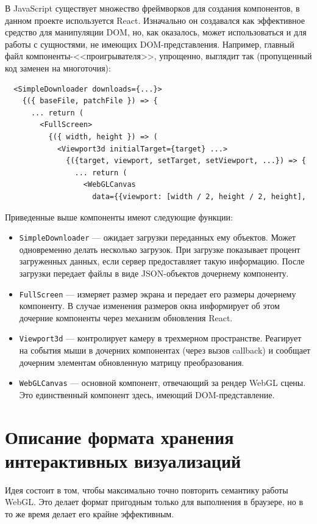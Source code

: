В JavaScript существует множество фреймворков для создания компонентов, в данном проекте используется React. Изначально он создавался как эффективное средство для манипуляции DOM, но, как оказалось, может использоваться и для работы с сущностями, не имеющих DOM-представления. Например, главный файл компоненты-<<проигрывателя>>, упрощенно, выглядит так (пропущенный код заменен на многоточия):
\begin{verbatim}
  <SimpleDownloader downloads={...}>
    {({ baseFile, patchFile }) => {
      ... return (
        <FullScreen>
          {({ width, height }) => (
            <Viewport3d initialTarget={target} ...>
              {({target, viewport, setTarget, setViewport, ...}) => {
                ... return (
                  <WebGLCanvas
                    data={{viewport: [width / 2, height / 2, height],
\end{verbatim}
Приведенные выше компоненты имеют следующие функции:
\begin{itemize}
\item \texttt{SimpleDownloader} --- ожидает загрузки переданных ему объектов. Может одновременно делать несколько загрузок. При загрузке показывает процент загруженных данных, если сервер предоставляет такую информацию. После загрузки передает файлы в виде JSON-объектов дочернему компоненту.
\item \texttt{FullScreen} --- измеряет размер экрана и передает его размеры дочернему компоненту. В случае изменения размеров окна информирует об этом дочерние компоненты через механизм обновления React.
\item \texttt{Viewport3d} --- контролирует камеру в трехмерном пространстве. Реагирует на события мыши в дочерних компонентах (через вызов callback) и сообщает дочерним элементам обновленную матрицу преобразования.
\item \texttt{WebGLCanvas} --- основной компонент, отвечающий за рендер WebGL сцены. Это единственный компонент здесь, имеющий DOM-представление.
\end{itemize}

\section{Описание формата хранения интерактивных визуализаций}

\label{sec:format}

Идея состоит в том, чтобы максимально точно повторить семантику работы WebGL. Это делает формат пригодным только для выполнения в браузере, но в то же время делает его крайне эффективным.

